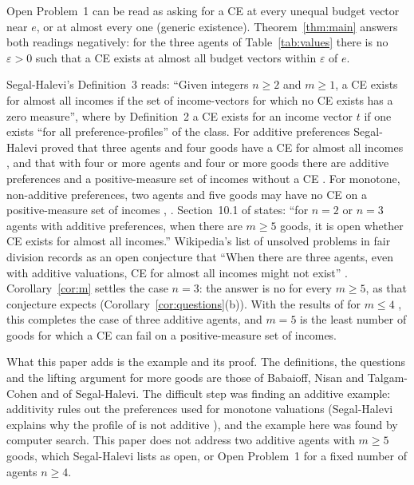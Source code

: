 \documentclass[11pt]{article}
\theoremstyle{definition}
\theoremstyle{remark}
\begin{document}
Open Problem~1 can be read as asking for a CE at every unequal budget
vector near $e$, or at almost every one (generic existence).
Theorem~\ref{thm:main} answers both readings negatively: for the three
agents of Table~\ref{tab:values} there is no $\varepsilon>0$ such that a CE
exists at almost all budget vectors within $\varepsilon$ of $e$.

Segal-Halevi's Definition~3 \cite{SH} reads: ``Given integers $n\ge2$ and
$m\ge1$, a CE exists for almost all incomes if the set of income-vectors
for which no CE exists has a zero measure'', where by Definition~2 a CE
exists for an income vector $t$ if one exists ``for all
preference-profiles'' of the class. For additive preferences Segal-Halevi
proved that three agents and four goods have a CE for almost all incomes
\cite[Theorem~4]{SH}, and that with four or more agents and four or more
goods there are additive preferences and a positive-measure set of
incomes without a CE \cite[Theorem~5]{SH}. For monotone, non-additive
preferences, two agents and five goods may have no CE on a
positive-measure set of incomes \cite[Theorem~3.5]{BNT2},
\cite[Theorem~6]{SH}. Section~10.1 of \cite{SH} states: ``for $n=2$ or
$n=3$ agents with additive preferences, when there are $m\ge5$ goods, it is
open whether CE exists for almost all incomes.'' Wikipedia's list of
unsolved problems in fair division records as an open conjecture that
``When there are three agents, even with additive valuations, CE for
almost all incomes might not exist'' \cite{Wik}. Corollary~\ref{cor:m}
settles the case $n=3$: the answer is no for every $m\ge5$, as that
conjecture expects (Corollary~\ref{cor:questions}(b)). With the results of
\cite{SH} for $m\le4$ \cite[table in Section~1, Theorem~4]{SH}, this
completes the case of three additive agents, and $m=5$ is the least number
of goods for which a CE can fail on a positive-measure set of incomes.

What this paper adds is the example and its proof. The definitions, the
questions and the lifting argument for more goods are those of Babaioff,
Nisan and Talgam-Cohen and of Segal-Halevi. The difficult step was finding
an additive example: additivity rules out the preferences used for
monotone valuations (Segal-Halevi explains why the profile of
\cite[Theorem~6]{SH} is not additive \cite[Section~10.1]{SH}), and the
example here was found by computer search. This paper does not address two
additive agents with $m\ge5$ goods, which Segal-Halevi lists as open, or
Open Problem~1 for a fixed number of agents $n\ge4$.
\end{document}
